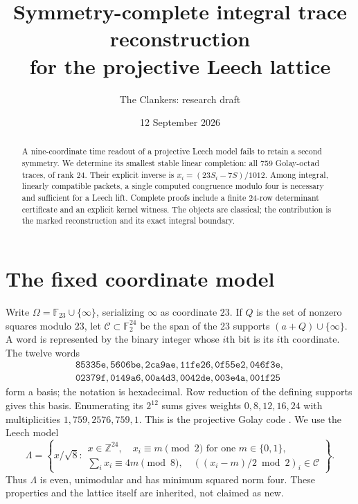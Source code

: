 \documentclass[10pt,reqno]{amsart}
\title{Symmetry-complete integral trace reconstruction\\
for the projective Leech lattice}
\author{The Clankers: research draft}
\date{12 September 2026}
\theoremstyle{remark}\newtheorem{remark}[theorem]{Remark}
\newcommand{\Z}{\mathbb Z}\newcommand{\Q}{\mathbb Q}\newcommand{\R}{\mathbb R}\newcommand{\F}{\mathbb F}
\newcommand{\La}{\Lambda}\newcommand{\tr}{\operatorname{tr}}
\begin{document}
\begin{abstract}
A nine-coordinate time readout of a projective Leech model fails to retain a second symmetry. We determine its smallest stable linear completion: all 759 Golay-octad traces, of rank 24. Their explicit inverse is $x_i=(23S_i-7S)/1012$. Among integral, linearly compatible packets, a single computed congruence modulo four is necessary and sufficient for a Leech lift. Complete proofs include a finite 24-row determinant certificate and an explicit kernel witness. The objects are classical; the contribution is the marked reconstruction and its exact integral boundary.
\end{abstract}
\maketitle
\section{The fixed coordinate model}
Write $\Omega=\F_{23}\cup\{\infty\}$, serializing $\infty$ as coordinate $23$. If $Q$ is the set of nonzero squares modulo $23$, let $\mathcal C\subset\F_2^{24}$ be the span of the 23 supports $(a+Q)\cup\{\infty\}$. A word is represented by the binary integer whose $i$th bit is its $i$th coordinate. The twelve words
\[
\begin{gathered}
\mathtt{85335e,
5606be,
2ca9ae,
11fe26,
0f55e2,
046f3e,}\\
\mathtt{02379f,
0149a6,
00a4d3,
0042de,
003e4a,
001f25}
\end{gathered}
\]
form a basis; the notation is hexadecimal. Row reduction of the defining supports gives this basis. Enumerating its $2^{12}$ sums gives weights $0,8,12,16,24$ with multiplicities $1,759,2576,759,1$. This is the projective Golay code \cite{chapman}. We use the Leech model \cite[Theorem 1.4]{brouwer}
\begin{equation}\label{eq:model}
\La=\left\{x/\sqrt8:\begin{array}{l}x\in\Z^{24},\quad x_i\equiv m\pmod2\text{ for one }m\in\{0,1\},\\
\sum_i x_i\equiv4m\pmod8,\quad ((x_i-m)/2\bmod2)_i\in\mathcal C\end{array}\right\}.
\end{equation}
Thus $\La$ is even, unimodular and has minimum squared norm four. These properties and the lattice itself are inherited, not claimed as new.
\end{document}
